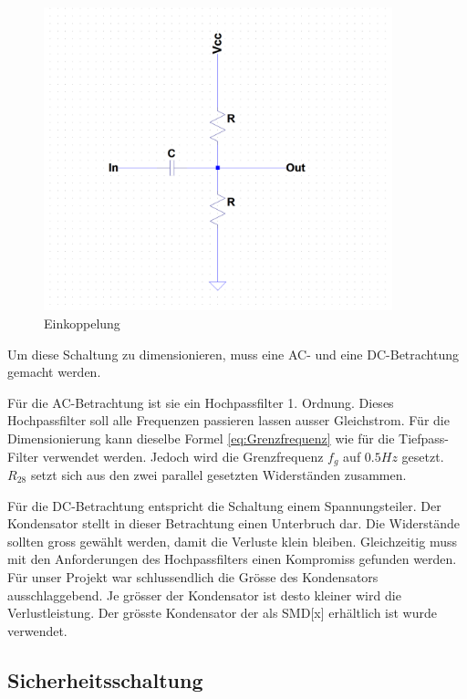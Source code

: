 \begin{figure}[H]
\begin{center}
\includegraphics[width=0.9\textwidth]{images/Analoge_Schaltung_Einkoppelung.png}
\caption{Einkoppelung}
\label{fig:Einkoppelung}
\end{center}
\end{figure}

Um diese Schaltung zu dimensionieren, muss eine AC- und eine DC-Betrachtung gemacht werden.


Für die AC-Betrachtung ist sie ein Hochpassfilter 1. Ordnung. Dieses Hochpassfilter soll alle Frequenzen passieren lassen ausser Gleichstrom. Für die Dimensionierung kann dieselbe Formel \eqref{eq:Grenzfrequenz} wie für die Tiefpass-Filter verwendet werden. Jedoch wird die Grenzfrequenz $f_g$ auf $0.5 Hz$ gesetzt. $R_{28}$ setzt sich aus den  zwei parallel gesetzten Widerständen zusammen.


Für die DC-Betrachtung entspricht die Schaltung einem Spannungsteiler. Der Kondensator stellt in dieser Betrachtung einen Unterbruch dar. Die Widerstände sollten gross gewählt werden, damit die Verluste klein bleiben. Gleichzeitig muss mit den Anforderungen des Hochpassfilters einen Kompromiss gefunden werden. Für unser Projekt war schlussendlich die Grösse des Kondensators ausschlaggebend. Je grösser der Kondensator ist desto kleiner wird die Verlustleistung. Der grösste Kondensator der als SMD[x] erhältlich ist wurde verwendet.

\subsection{Sicherheitsschaltung}


